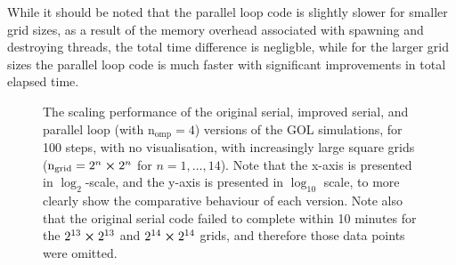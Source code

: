 \documentclass[]{article}
\begin{document}
While it should be noted that the parallel loop code is slightly slower for
smaller grid sizes, as a result of the memory overhead associated with spawning
and destroying threads, the total time difference is negligble, while for the
larger grid sizes the parallel loop code is much faster with significant
improvements in total elapsed time.

\begin{figure}[h]
  \centering
  \caption{The scaling performance of the original serial, improved serial, and
    parallel loop (with $\mathrm{n_{omp}} = 4$) versions of the GOL simulations,
    for 100 steps, with no visualisation, with increasingly large square grids
    ($\mathrm{n_{grid}} = 2^{n}\cross 2^{n}$ for $n = 1, \dotsc, 14$).
    Note that the x-axis is presented in $\log_{2}$-scale, and the y-axis is
    presented in $\log_{10}$ scale, to more clearly show the comparative
    behaviour of each version.
    Note also that the original serial code failed to complete within
    10 minutes for the $2^{13} \cross 2^{13}$ and $2^{14} \cross 2^{14}$
    grids, and therefore those data points were omitted.
  }
  \label{fig:scaling}
\end{figure}
\end{document}
